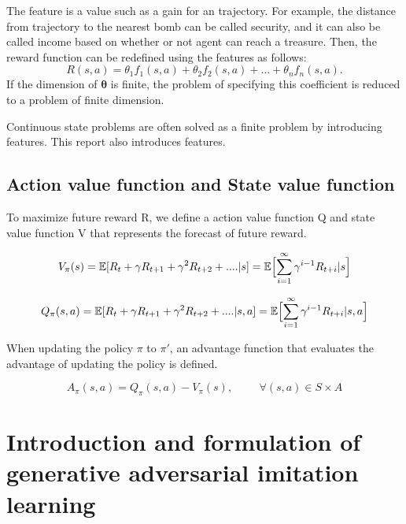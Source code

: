 The feature is a value such as a gain for an trajectory. For example, the distance from trajectory to the nearest bomb can be called security, and it can also be called income based on whether or not agent can reach a treasure.
Then, the reward function can be redefined using the features as follows:
\[
R(s,a) = \theta_1 f_1(s,a) + \theta_2 f_2(s,a) + ... + \theta_n f_n(s,a).
\]
If the dimension of ${\bm \theta}$ is finite, the problem of specifying this coefficient is reduced to a problem of finite dimension.

Continuous state problems are often solved as a finite problem by introducing features. This report also introduces features.


\subsection{Action value function and State value function}

To maximize future reward R, we define a action value function Q and state value function V that represents the forecast of future reward.

\[
V_{\pi}(s) = \mathbb{E}[R_{t} + \gamma R_{t+1} + \gamma^{2} R_{t+2}  + ....|s] = \mathbb{E} \Bigl[ \sum_{i=1}^{\infty} \gamma ^{i-1} R_{t+i} |s \Bigr]
\]

\[
Q_{\pi}(s,a) = \mathbb{E}[R_{t} + \gamma R_{t+1} + \gamma^{2} R_{t+2}  + ....|s,a] = \mathbb{E} \Bigl[ \sum_{i=1}^{\infty} \gamma ^{i-1} R_{t+i} |s,a \Bigr]
\]

When updating the policy $\pi$ to $\pi′$, an advantage function that evaluates the advantage of updating the policy is defined.

\[
A_{\pi}(s,a) = Q_{\pi}(s,a) - V_{\pi}(s), \hspace{1cm} \forall (s,a) \in S \times A 
\]



\section{Introduction and formulation of generative adversarial imitation learning}

